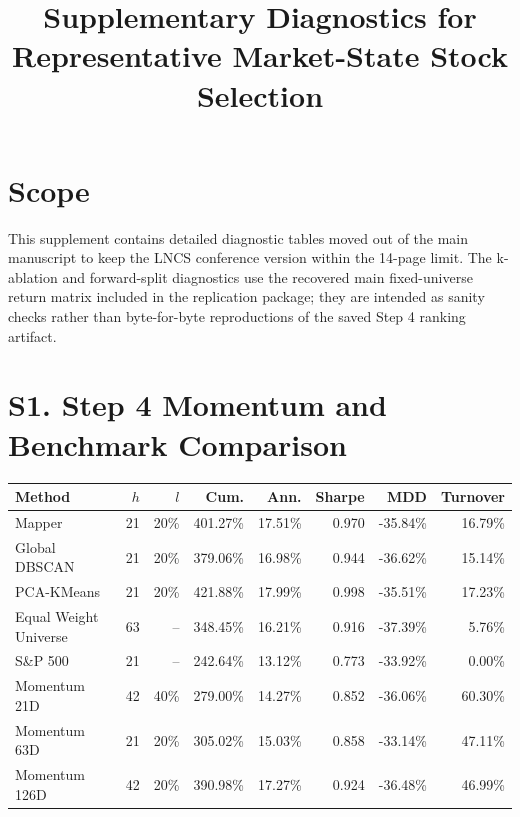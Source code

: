 \documentclass[10pt]{article}
\title{Supplementary Diagnostics for Representative Market-State Stock Selection}
\author{}
\date{}
\begin{document}
\maketitle

\section*{Scope}
This supplement contains detailed diagnostic tables moved out of the main manuscript to keep the LNCS conference version within the 14-page limit. The k-ablation and forward-split diagnostics use the recovered main fixed-universe return matrix included in the replication package; they are intended as sanity checks rather than byte-for-byte reproductions of the saved Step 4 ranking artifact.

\section*{S1. Step 4 Momentum and Benchmark Comparison}
\begin{table}[h]
\centering
\small
\begin{tabular}{lrrrrrrr}
\toprule
Method & $h$ & $l$ & Cum. & Ann. & Sharpe & MDD & Turnover \\
\midrule
Mapper & 21 & 20\% & 401.27\% & 17.51\% & 0.970 & -35.84\% & 16.79\% \\
Global DBSCAN & 21 & 20\% & 379.06\% & 16.98\% & 0.944 & -36.62\% & 15.14\% \\
PCA-KMeans & 21 & 20\% & 421.88\% & 17.99\% & 0.998 & -35.51\% & 17.23\% \\
Equal Weight Universe & 63 & -- & 348.45\% & 16.21\% & 0.916 & -37.39\% & 5.76\% \\
S\&P 500 & 21 & -- & 242.64\% & 13.12\% & 0.773 & -33.92\% & 0.00\% \\
Momentum 21D & 42 & 40\% & 279.00\% & 14.27\% & 0.852 & -36.06\% & 60.30\% \\
Momentum 63D & 21 & 20\% & 305.02\% & 15.03\% & 0.858 & -33.14\% & 47.11\% \\
Momentum 126D & 42 & 20\% & 390.98\% & 17.27\% & 0.924 & -36.48\% & 46.99\% \\
\bottomrule
\end{tabular}
\end{table}
\end{document}
